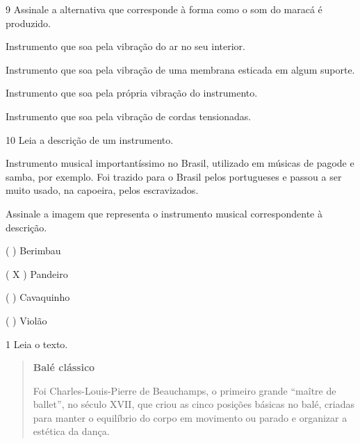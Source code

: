 \num{9}  Assinale a alternativa que corresponde à forma como o som do maracá é produzido.

\begin{boxlist}
 Instrumento que soa pela vibração do ar no seu interior.

 Instrumento que soa pela vibração de uma membrana esticada em algum suporte.

 Instrumento que soa pela própria vibração do instrumento.

 Instrumento que soa pela vibração de cordas tensionadas.
\end{boxlist}


\num{10} Leia a descrição de um instrumento.

Instrumento musical importantíssimo no Brasil, utilizado em músicas
de pagode e samba, por exemplo. Foi trazido para o Brasil pelos portugueses
e passou a ser muito usado, na capoeira, pelos escravizados.

Assinale a imagem que representa o instrumento musical correspondente à descrição.

( )
Berimbau


( X )
Pandeiro

( )
Cavaquinho


( )
Violão



\num{1} Leia o texto.

\begin{quote}
\textbf{Balé clássico}

Foi Charles-Louis-Pierre de Beauchamps, o primeiro grande ``maître de ballet'', no século XVII, que criou as cinco posições básicas no balé, criadas para manter o equilíbrio do corpo em movimento ou parado e organizar a estética da dança.

\end{quote}

